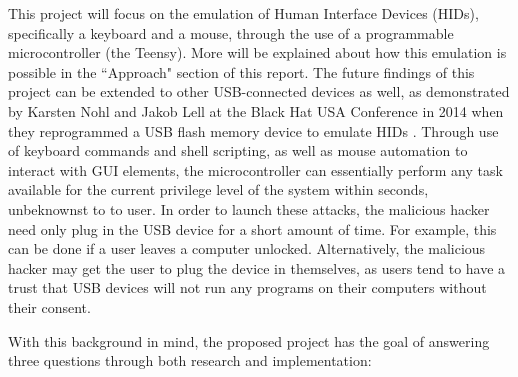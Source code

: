 \documentclass[pagenumbers]{ieee}
\begin{document}
This project will focus on the emulation of Human Interface Devices (HIDs), specifically a keyboard and a mouse, through the use of a programmable microcontroller (the Teensy). More will be explained about how this emulation is possible in the ``Approach" section of this report. The future findings of this project can be extended to other USB-connected devices as well, as demonstrated by Karsten Nohl and Jakob Lell at the Black Hat USA Conference in 2014 when they reprogrammed a USB flash memory device to emulate HIDs \cite{nohl}. Through use of keyboard commands and shell scripting, as well as mouse automation to interact with GUI elements, the microcontroller can essentially perform any task available for the current privilege level of the system within seconds, unbeknownst to to user. In order to launch these attacks, the malicious hacker need only plug in the USB device for a short amount of time. For example, this can be done if a user leaves a computer unlocked. Alternatively, the malicious hacker may get the user to plug the device in themselves, as users tend to have a trust that USB devices will not run any programs on their computers without their consent.


With this background in mind, the proposed project has the goal of answering three questions through both research and implementation:
\end{document}

